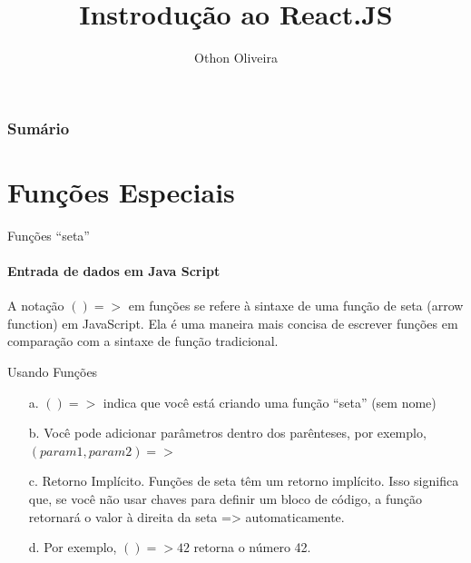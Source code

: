 \documentclass[13pt, xcolor={dvipsnames,svgnames}, portuguese]{beamer}
\author{Othon Oliveira}
\title{Instrodução ao React.JS}
\institute{SENAC - PROA}
\date{}
\begin{document}
\begin{frame}
\titlepage
\end{frame}

\newcommand{\capa}{
    \begin{tikzpicture}[remember picture,overlay]
        \node at (current page.south west)
            {\begin{tikzpicture}[remember picture, overlay]
                \fill[shading=radial,top color=orange,bottom color=orange,middle color=yellow] (0,0) rectangle (\paperwidth,\paperheight);
            \end{tikzpicture}
          };
    \end{tikzpicture}
}

\begin{frame}\frametitle{Sumário}
\tableofcontents
\end{frame}


\section{Funções Especiais}
\begin{frame}{Funções ``seta''}
\framesubtitle{ Entrada de dados em Java Script}
A notação $() =>$ em funções se refere à sintaxe de uma função 
de seta (arrow function) em JavaScript. Ela é uma maneira mais
concisa de escrever funções em comparação com a sintaxe de
função tradicional.
	\begin{block}{Usando Funções}
		\begin{itemize}
		  \item[a.] $() =>$ indica que você está criando uma função ``seta'' (sem nome)
		  \pause
		  \item[b.] Você pode adicionar parâmetros dentro dos parênteses, por exemplo, $(param1, param2) =>$
		   \pause		  
		  \item[c.] Retorno Implícito. Funções de seta têm um retorno implícito. Isso significa que, se você não usar chaves {} para definir um bloco de código, a função retornará o valor à direita da seta => automaticamente.
		  \pause
		  \item[d.] Por exemplo, $() => 42$ retorna o número 42.
		\end{itemize}
	\end{block} 
\end{frame}

\end{document}
